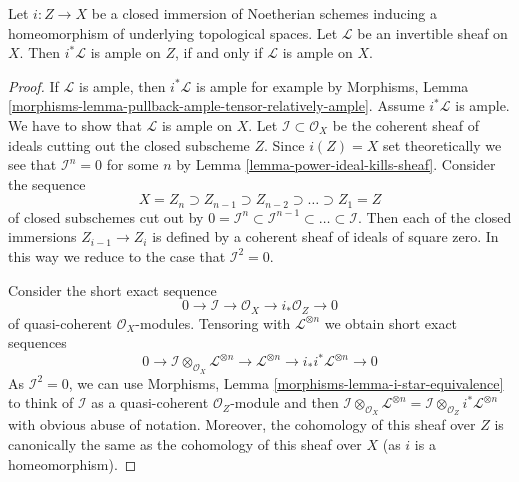 \begin{lemma}
\label{lemma-ample-on-reduction}
Let $i : Z \to X$ be a closed immersion of Noetherian schemes
inducing a homeomorphism of underlying topological spaces.
Let $\mathcal{L}$ be an invertible sheaf on $X$.
Then $i^*\mathcal{L}$ is ample on $Z$, if and only if
$\mathcal{L}$ is ample on $X$.
\end{lemma}

\begin{proof}
If $\mathcal{L}$ is ample, then $i^*\mathcal{L}$ is ample for
example by Morphisms, Lemma
\ref{morphisms-lemma-pullback-ample-tensor-relatively-ample}.
Assume $i^*\mathcal{L}$ is ample. We have to show that $\mathcal{L}$
is ample on $X$.
Let $\mathcal{I} \subset \mathcal{O}_X$ be the coherent sheaf of ideals
cutting out the closed subscheme $Z$. Since $i(Z) = X$ set theoretically
we see that $\mathcal{I}^n = 0$ for some $n$ by
Lemma \ref{lemma-power-ideal-kills-sheaf}.
Consider the sequence
$$
X = Z_n \supset Z_{n - 1} \supset Z_{n - 2} \supset \ldots \supset Z_1 = Z
$$
of closed subschemes cut out by
$0 = \mathcal{I}^n \subset \mathcal{I}^{n - 1} \subset \ldots \subset
\mathcal{I}$. Then each of the closed immersions $Z_{i - 1} \to Z_{i}$
is defined by a coherent sheaf of ideals of square zero. In this way
we reduce to the case that $\mathcal{I}^2 = 0$.

\medskip\noindent
Consider the short exact sequence
$$
0 \to \mathcal{I} \to \mathcal{O}_X \to i_*\mathcal{O}_Z \to 0
$$
of quasi-coherent $\mathcal{O}_X$-modules. Tensoring with
$\mathcal{L}^{\otimes n}$ we obtain short exact sequences
\begin{equation}
\label{equation-ses}
0 \to \mathcal{I} \otimes_{\mathcal{O}_X} \mathcal{L}^{\otimes n}
\to \mathcal{L}^{\otimes n} \to i_*i^*\mathcal{L}^{\otimes n} \to 0
\end{equation}
As $\mathcal{I}^2 = 0$, we can use
Morphisms, Lemma \ref{morphisms-lemma-i-star-equivalence}
to think of $\mathcal{I}$ as a quasi-coherent $\mathcal{O}_Z$-module
and then $\mathcal{I} \otimes_{\mathcal{O}_X} \mathcal{L}^{\otimes n} =
\mathcal{I} \otimes_{\mathcal{O}_Z} i^*\mathcal{L}^{\otimes n}$ with
obvious abuse of notation.
Moreover, the cohomology of this sheaf over $Z$ is canonically
the same as the cohomology of this sheaf over $X$ (as $i$ is a
homeomorphism).


\end{proof}
